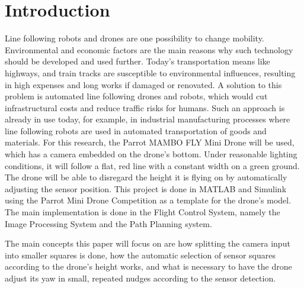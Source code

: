 \documentclass[a4paper, 10pt, conference]{IEEEtran}
\begin{document}
\section{Introduction}
Line following robots and drones are one possibility to change mobility. Environmental and economic factors are the main reasons why such technology should be developed and used further. Today’s transportation means like highways, and train tracks are susceptible to environmental influences, resulting in high expenses and long works if damaged or renovated. A solution to this problem is automated line following drones and robots, which would cut infrastructural costs and reduce traffic risks for humans. Such an approach is already in use today, for example, in industrial manufacturing processes where line following robots are used in automated transportation of goods and materials. \cite{8679260} 
For this research, the Parrot MAMBO FLY Mini Drone will be used, which has a camera embedded on the drone’s bottom. Under reasonable lighting conditions, it will follow a flat, red line with a constant width on a green ground. The drone will be able to disregard the height it is flying on by automatically adjusting the sensor position. This project is done in MATLAB and Simulink using the Parrot Mini Drone Competition as a template for the drone’s model. The main implementation is done in the Flight Control System, namely the Image Processing System and the Path Planning system.\\\par
The main concepts this paper will focus on are how splitting the camera input into smaller squares is done, how the automatic selection of sensor squares according to the drone’s height works, and what is necessary to have the drone adjust its yaw in small, repeated nudges according to the sensor detection.\par
\end{document}
